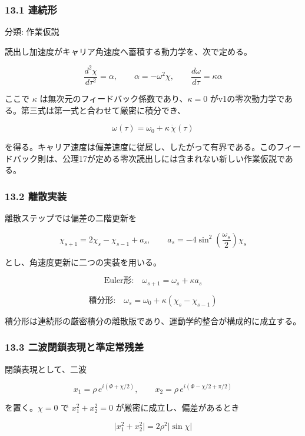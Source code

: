 \documentclass[
  a4paper,
]{ltjsarticle}
\begin{document}
\subsubsection{13.1 連続形}\label{ux9023ux7d9aux5f62}

分類: 作業仮説

読出し加速度がキャリア角速度へ蓄積する動力学を、次で定める。

\[
\frac{d^2\chi}{d\tau^2}=\alpha,
\qquad
\alpha=-\omega^2\chi,
\qquad
\frac{d\omega}{d\tau}=\kappa\alpha
\]

ここで \(\kappa\) は無次元のフィードバック係数であり、\(\kappa=0\)
がv1の零次動力学である。第三式は第一式と合わせて厳密に積分でき、

\[
\boxed{
\omega(\tau)=\omega_0+\kappa\,\dot\chi(\tau)
}
\]

を得る。キャリア速度は偏差速度に従属し、したがって有界である。このフィードバック則は、公理17が定める零次読出しには含まれない新しい作業仮説である。

\subsubsection{13.2 離散実装}\label{ux96e2ux6563ux5b9fux88c5}

離散ステップでは偏差の二階更新を

\[
\chi_{s+1}=2\chi_s-\chi_{s-1}+a_s,
\qquad
a_s=-4\sin^2\!\left(\frac{\omega_s}{2}\right)\chi_s
\]

とし、角速度更新に二つの実装を用いる。

\[
\text{Euler形:}\quad
\omega_{s+1}=\omega_s+\kappa a_s
\]

\[
\text{積分形:}\quad
\omega_s=\omega_0+\kappa(\chi_s-\chi_{s-1})
\]

積分形は連続形の厳密積分の離散版であり、運動学的整合が構成的に成立する。

\subsubsection{13.3
二波閉鎖表現と準定常残差}\label{ux4e8cux6ce2ux9589ux9396ux8868ux73feux3068ux6e96ux5b9aux5e38ux6b8bux5dee}

閉鎖表現として、二波

\[
x_1=\rho\,e^{i(\Phi+\chi/2)},
\qquad
x_2=\rho\,e^{i(\Phi-\chi/2+\pi/2)}
\]

を置く。\(\chi=0\) で \(x_1^2+x_2^2=0\) が厳密に成立し、偏差があるとき

\[
\lvert x_1^2+x_2^2\rvert=2\rho^2\lvert\sin\chi\rvert
\]
\end{document}
